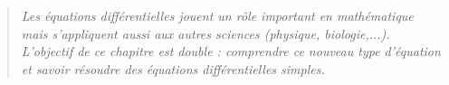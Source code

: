 \documentclass[11pt,a4paper]{report}
\begin{document}



\bigskip
\bigskip

\begin{quote}
\center
\emph{Les équations différentielles jouent un rôle important en mathématique mais s'appliquent aussi aux autres sciences (physique, biologie,...). L'objectif de ce chapitre est double : comprendre ce nouveau type d'équation et savoir résoudre des équations différentielles simples.}
\end{quote}

\bigskip
\bigskip
\end{document}
